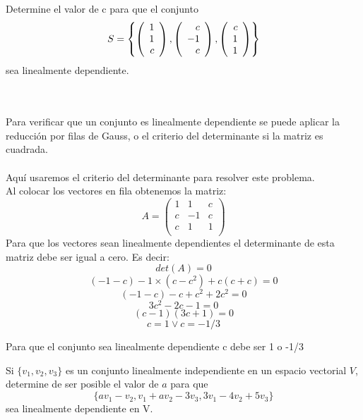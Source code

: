 \begin{enumerate}
\begin{prob}[]
\end{prob}


\begin{prop}[]

Determine el valor de c para que el conjunto $$S=\left\lbrace  \left( \begin{array}{r} 1\\ 1\\ c \end{array} \right) , \left( \begin{array}{r} c\\ -1\\ c \end{array} \right) , \left( \begin{array}{r} c\\ 1\\ 1 \end{array} \right) \right\rbrace $$ sea linealmente dependiente.
\end{prop}
~\\
\sol
~\\
Para verificar que un conjunto es linealmente dependiente se puede aplicar la reducción por filas de Gauss, o el criterio del determinante si la matriz es cuadrada.
~\\~\\
Aquí usaremos el criterio del determinante para resolver este problema.
~\\
Al colocar los vectores en fila obtenemos la matriz:
~\\
 $$A=\left(\begin{array}{rrr}
1&1&c\\
c&-1&c\\
c&1&1\\
\end{array}\right)$$
Para que los vectores sean linealmente dependientes el determinante de esta matriz debe ser igual a cero. Es decir:~\\
\[det(A)=0\]
\[(-1-c)-1\times(c-c^2)+c(c+c)=0\]
\[(-1-c)-c+c^2+2c^2=0\]
\[3c^2-2c-1=0\]
\[(c-1)(3c+1)=0\]
\[c=1 \vee c=-1/3\]

Para que el conjunto sea linealmente dependiente c debe ser 1 o -1/3


\begin{prob}[]

Si $\{v_1, v_2, v_3\} $ es un conjunto linealmente independiente en un espacio vectorial $V$, determine de ser posible el valor de $a$ para que $$\{av_1-v_2, v_1+av_2-3v_3, 3v_1 -4v_2+5v_3 \}$$ sea linealmente dependiente en V.
\end{prob}





\end{enumerate}

